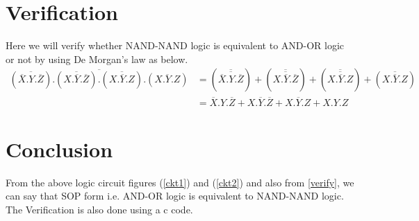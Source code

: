 \documentclass{article}
\begin{document}
\section{Verification}
Here we will verify whether NAND-NAND logic is equivalent to AND-OR logic or not by using De Morgan's law as below.
\begin{equation}
\begin{split}
    \overline{\left(\overline{\overline{X}.Y.\overline{Z}}\right).\left(\overline{X.\overline{Y}.\overline{Z}}\right).\left(\overline{X.\overline{Y}.Z}\right).\left(\overline{X.Y.Z}\right)}&=\left(\overline{\overline{\overline{X}.Y.\overline{Z}}}\right)+\left(\overline{\overline{X.\overline{Y}.\overline{Z}}}\right)+\left(\overline{\overline{X.\overline{Y}.Z}}\right)+\left(\overline{\overline{X.Y.Z}}\right)\\
    &=\overline{X}.Y.\overline{Z}+X.\overline{Y}.\overline{Z}+X.\overline{Y}.Z+X.Y.Z
\end{split}
\label{verify}
\end{equation}
\section{Conclusion}
From the above logic circuit figures (\ref{ckt1}) and (\ref{ckt2}) and also from \ref{verify}, we can say that SOP form i.e. AND-OR logic is equivalent to NAND-NAND logic. The Verification is also done using a c code.
\end{document}
